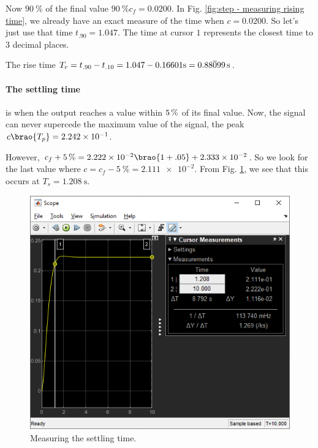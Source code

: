 \documentclass[12pt]{article}
\newcommand*\siexpr[2][]{\SI[parse-numbers=false,#1]{#2}}%
\DeclarePairedDelimiter\brao()%
\begin{document}
Now $\SI{90}\percent$ of the final value $\SI{90}\percent c_f = 0.0200$.
In Fig. \ref{fig:step - measuring rising time}, we already have an exact measure of the time when $c = 0.0200$.
So let's just use that time $t_{.90} = 1.047$.
The time at cursor $1$ represents the closest time to $3$ decimal places.

The rise time $T_r = t_{.90} - t_{.10} = 1.047 - 0.16601 \si\second = \siexpr{0.88\overline099}\second$.

\paragraph{The settling time} is when the output reaches a value within $\SI5\percent$ of its final value.
Now, the signal can never supercede the maximum value of the signal, the peak $c\brao{T_p} = \num{2.242e-1}$.

However, $c_f + \SI{5}\percent = \num{2.222e-2}\brao{1 + .05} + \num{2.333e-2}$.
So we look for the last value where $c = c_f - \SI{5}\percent = \num{2.111e-2}$.
From Fig. \ref{fig:step - measuring setting time}, we see that this occurs at $T_s = \SI{1.208}\second$.

\begin{figure}[h]
    \centering
    \includegraphics[width=\linewidth]{part01a_measuring_settling_time.png}
    \caption{Measuring the settling time.}
    \label{fig:step - measuring setting time}
\end{figure}
\end{document}
